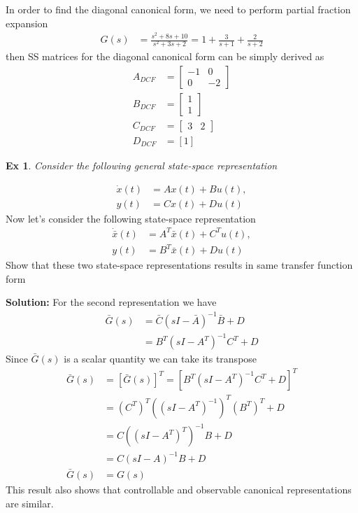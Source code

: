 \documentclass[twoside]{article}
\newtheorem{exmp}[theorem]{Ex}
\begin{document}
%
In order to find the diagonal canonical form, we need to perform partial fraction
expansion 
%
\begin{align*}
G(s) &= \frac{s^2 + 8 s + 10}{s^2 + 3 s + 2}
	= 1 + \frac{3}{s+1} + \frac{2}{s+2}
\end{align*}
%
then SS matrices for the diagonal canonical form can be simply derived as
%
\begin{align*}
	A_{DCF} &=  \left[ \begin{array}{cc} -1 & 0  \\  0 & -2 \end{array} \right]
		\\
	B_{DCF} &=  \left[ \begin{array}{c} 1  \\  1 \end{array} \right]
		\\
	C_{DCF} &= \left[ \begin{array}{cc} 3  &  2 \end{array} \right]
	\\
	 D_{DCF} &=  [1]
\end{align*}

\begin{exmp}
Consider the following general state-space representation
\end{exmp} 
%
\begin{align*}
  \dot{x}(t) &= A x(t) + B u(t) , \\
  y(t) &= C x(t) + D u(t) 
\end{align*}
%
Now let's consider the following
state-space representation
%
\begin{align*}
  \dot{\bar{x}}(t) &= A^T \bar{x}(t) + C^T u(t) , \\
  y(t) &= B^T \bar{x}(t) + D u(t) 
\end{align*}
%
Show that these two state-space representations 
results in same transfer function form

\vspace{6pt}

\textbf{Solution:} 
%
For the second representation we have 
%
\begin{align*}
\bar{G}(s) &= \bar{C} \left( s I - \bar{A} \right)^{-1} \bar{B} + D
	\\
	&= B^T \left( s I - A^T \right)^{-1} C^T + D
\end{align*}
%
Since $\bar{G}(s)$ is a scalar quantity we can take its
transpose 
%
\begin{align*}
	\bar{G}(s) &= [\bar{G}(s)]^T = 
	[ B^T \left( s I - A^T \right)^{-1} C^T + D ]^T
	\\
	&= (C^T)^T \left( \left( s I - A^T \right)^{-1} \right)^T (B^T)^T + D
	\\
	&= C \left( \left( s I - A^T \right)^T \right)^{-1} B + D
	\\
	&= C \left( s I - A \right)^{-1} B + D
	\\
	\bar{G}(s) &= G(s)
\end{align*}
%
This result also shows that controllable and observable 
canonical representations are similar. 
\end{document}
